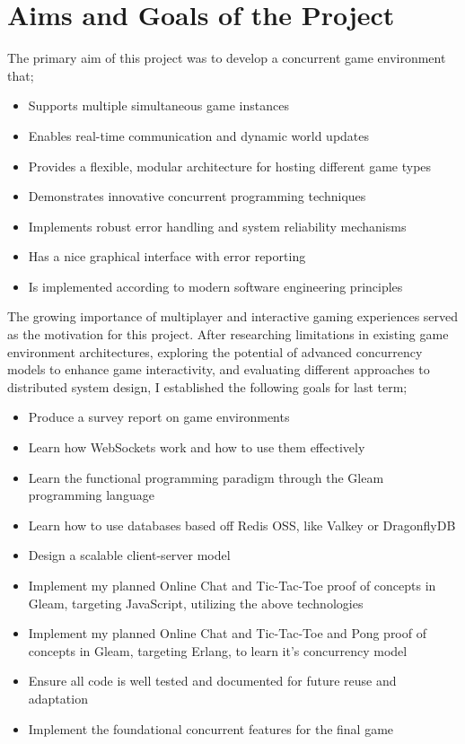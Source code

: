 \documentclass[]{final}
\begin{document}
\section{Aims and Goals of the Project}
The primary aim of this project was to develop a concurrent game environment that;
\begin{itemize}
  \item Supports multiple simultaneous game instances
  \item Enables real-time communication and dynamic world updates
  \item Provides a flexible, modular architecture for hosting different game types
  \item Demonstrates innovative concurrent programming techniques
  \item Implements robust error handling and system reliability mechanisms
  \item Has a nice graphical interface with error reporting
  \item Is implemented according to modern software engineering principles
\end{itemize}

\newpage

The growing importance of multiplayer and interactive gaming experiences served
as the motivation for this project. After researching limitations in existing
game environment architectures, exploring the potential of advanced
concurrency models to enhance game interactivity, and evaluating different
approaches to distributed system design, I established the following goals
for last term;

\begin{itemize}
  \item Produce a survey report on game environments
  \item Learn how WebSockets work and how to use them effectively
  \item Learn the functional programming paradigm through the Gleam programming language
  \item Learn how to use databases based off Redis OSS, like Valkey or DragonflyDB
  \item Design a scalable client-server model
  \item Implement my planned Online Chat and Tic-Tac-Toe proof of concepts in Gleam, targeting JavaScript, utilizing the above technologies
  \item Implement my planned Online Chat and Tic-Tac-Toe and Pong proof of concepts in Gleam, targeting Erlang, to learn it's concurrency model
  \item Ensure all code is well tested and documented for future reuse and adaptation
  \item Implement the foundational concurrent features for the final game
\end{itemize}
\end{document}
